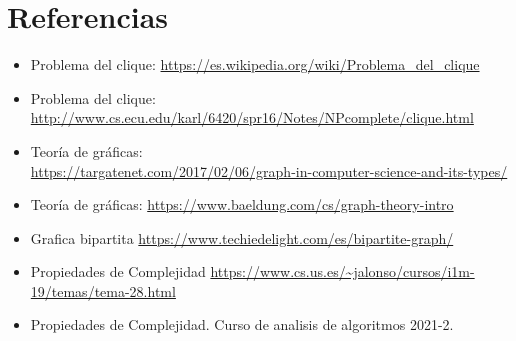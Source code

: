 \documentclass[12pt,letterpaper]{article}
\begin{document}
\newpage
\section*{Referencias}
\begin{itemize}
    \item Problema del clique: \url{https://es.wikipedia.org/wiki/Problema_del_clique}
    
    \item Problema del clique: \url{http://www.cs.ecu.edu/karl/6420/spr16/Notes/NPcomplete/clique.html}
    
    \item Teoría de gráficas:\\
    \url{https://targatenet.com/2017/02/06/graph-in-computer-science-and-its-types/}
    
    \item Teoría de gráficas: \url{https://www.baeldung.com/cs/graph-theory-intro}
    
    \item Grafica bipartita \url{https://www.techiedelight.com/es/bipartite-graph/}
    
    \item Propiedades de Complejidad
    \url{https://www.cs.us.es/~jalonso/cursos/i1m-19/temas/tema-28.html}
    
    \item Propiedades de Complejidad. Curso de analisis de algoritmos 2021-2.
    
\end{itemize}
\end{document}
